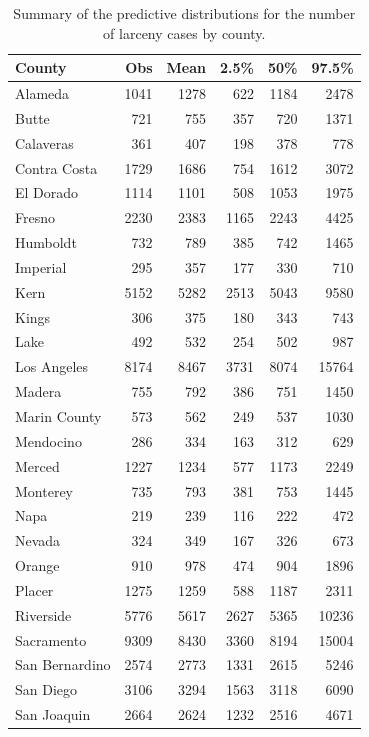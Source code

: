 \documentclass{asaproc}
\begin{document}
\begin{table}[p!]
\caption{\enspace Summary of the predictive distributions for the number of larceny cases by county.}
\centering
\begin{tabular}{lrrrrr}
\\ [-5pt]
County & Obs & Mean & 2.5\% & 50\% & 97.5\% \\ 
  \hline
Alameda & 1041 & 1278 & 622 & 1184 & 2478 \\ 
  Butte & 721 & 755 & 357 & 720 & 1371 \\ 
  Calaveras & 361 & 407 & 198 & 378 & 778 \\ 
  Contra Costa & 1729 & 1686 & 754 & 1612 & 3072 \\ 
  El Dorado & 1114 & 1101 & 508 & 1053 & 1975 \\ 
  Fresno & 2230 & 2383 & 1165 & 2243 & 4425 \\ 
  Humboldt & 732 & 789 & 385 & 742 & 1465 \\ 
  Imperial & 295 & 357 & 177 & 330 & 710 \\ 
  Kern & 5152 & 5282 & 2513 & 5043 & 9580 \\ 
  Kings & 306 & 375 & 180 & 343 & 743 \\ 
  Lake & 492 & 532 & 254 & 502 & 987 \\ 
  Los Angeles & 8174 & 8467 & 3731 & 8074 & 15764 \\ 
  Madera & 755 & 792 & 386 & 751 & 1450 \\ 
  Marin County & 573 & 562 & 249 & 537 & 1030 \\ 
  Mendocino & 286 & 334 & 163 & 312 & 629 \\ 
  Merced & 1227 & 1234 & 577 & 1173 & 2249 \\ 
  Monterey & 735 & 793 & 381 & 753 & 1445 \\ 
  Napa & 219 & 239 & 116 & 222 & 472 \\ 
  Nevada & 324 & 349 & 167 & 326 & 673 \\ 
  Orange & 910 & 978 & 474 & 904 & 1896 \\ 
  Placer & 1275 & 1259 & 588 & 1187 & 2311 \\ 
  Riverside & 5776 & 5617 & 2627 & 5365 & 10236 \\ 
  Sacramento & 9309 & 8430 & 3360 & 8194 & 15004 \\ 
  San Bernardino & 2574 & 2773 & 1331 & 2615 & 5246 \\ 
  San Diego & 3106 & 3294 & 1563 & 3118 & 6090 \\ 
  San Joaquin & 2664 & 2624 & 1232 & 2516 & 4671 \\ 

\end{tabular}
\end{table}
\end{document}
